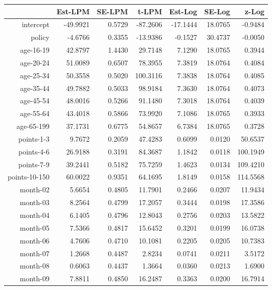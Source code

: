 \documentclass[10pt]{article}
\begin{document}
\begin{table}[ht]
\centering
\begin{tabular}{rrrrrrr}
  \hline
 & Est-LPM & SE-LPM & t-LPM & Est-Log & SE-Log & z-Log \\ 
  \hline
intercept & -49.9921 & 0.5729 & -87.2606 & -17.1444 & 18.0765 & -0.9484 \\ 
  policy & -4.6766 & 0.3355 & -13.9386 & -0.1527 & 30.4737 & -0.0050 \\ 
  age-16-19 & 42.8797 & 1.4430 & 29.7148 & 7.1290 & 18.0765 & 0.3944 \\ 
  age-20-24 & 51.0089 & 0.6507 & 78.3955 & 7.3819 & 18.0764 & 0.4084 \\ 
  age-25-34 & 50.3558 & 0.5020 & 100.3116 & 7.3838 & 18.0764 & 0.4085 \\ 
  age-35-44 & 49.7882 & 0.5033 & 98.9184 & 7.3630 & 18.0764 & 0.4073 \\ 
  age-45-54 & 48.0016 & 0.5266 & 91.1480 & 7.3018 & 18.0764 & 0.4039 \\ 
  age-55-64 & 43.4018 & 0.5866 & 73.9920 & 7.1086 & 18.0765 & 0.3933 \\ 
  age-65-199 & 37.1731 & 0.6775 & 54.8657 & 6.7384 & 18.0765 & 0.3728 \\ 
  points-1-3 & 9.7672 & 0.2059 & 47.4283 & 0.6099 & 0.0120 & 50.6537 \\ 
  points-4-6 & 26.9188 & 0.3191 & 84.3687 & 1.1842 & 0.0118 & 100.1949 \\ 
  points-7-9 & 39.2441 & 0.5182 & 75.7259 & 1.4623 & 0.0134 & 109.4210 \\ 
  points-10-150 & 60.0022 & 0.9351 & 64.1695 & 1.8149 & 0.0158 & 114.5568 \\ 
  month-02 & 5.6654 & 0.4805 & 11.7901 & 0.2466 & 0.0207 & 11.9434 \\ 
  month-03 & 8.2564 & 0.4799 & 17.2057 & 0.3444 & 0.0198 & 17.3586 \\ 
  month-04 & 6.1405 & 0.4796 & 12.8043 & 0.2756 & 0.0203 & 13.5822 \\ 
  month-05 & 7.5366 & 0.4817 & 15.6452 & 0.3201 & 0.0199 & 16.0738 \\ 
  month-06 & 4.7606 & 0.4710 & 10.1081 & 0.2205 & 0.0205 & 10.7383 \\ 
  month-07 & 1.2668 & 0.4487 & 2.8234 & 0.0741 & 0.0211 & 3.5172 \\ 
  month-08 & 0.6063 & 0.4437 & 1.3664 & 0.0360 & 0.0213 & 1.6900 \\ 
  month-09 & 7.8811 & 0.4850 & 16.2487 & 0.3363 & 0.0200 & 16.7914 \\ 

\end{tabular}
\end{table}
\end{document}
